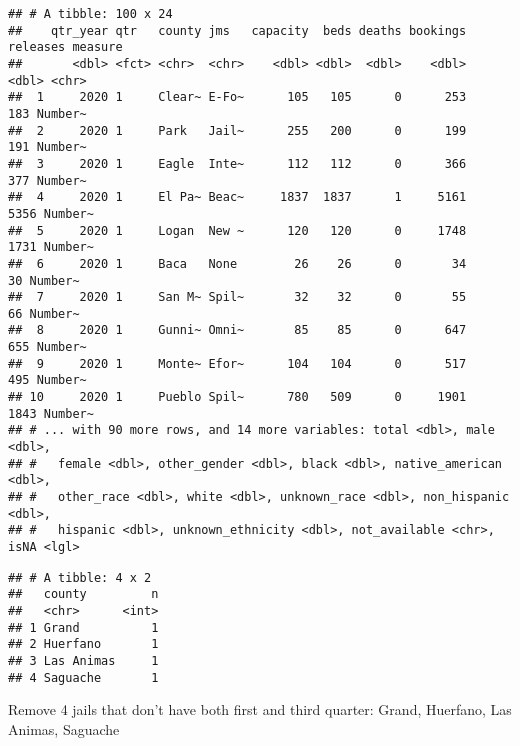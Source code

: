 \documentclass[
]{article}
\newenvironment{Shaded}{\begin{snugshade}}{\end{snugshade}}
\newcommand{\DecValTok}[1]{\textcolor[rgb]{0.00,0.00,0.81}{#1}}
\newcommand{\KeywordTok}[1]{\textcolor[rgb]{0.13,0.29,0.53}{\textbf{#1}}}
\newcommand{\NormalTok}[1]{#1}
\newcommand{\OperatorTok}[1]{\textcolor[rgb]{0.81,0.36,0.00}{\textbf{#1}}}
\newcommand{\StringTok}[1]{\textcolor[rgb]{0.31,0.60,0.02}{#1}}
\begin{document}
\begin{verbatim}
## # A tibble: 100 x 24
##    qtr_year qtr   county jms   capacity  beds deaths bookings releases measure
##       <dbl> <fct> <chr>  <chr>    <dbl> <dbl>  <dbl>    <dbl>    <dbl> <chr>  
##  1     2020 1     Clear~ E-Fo~      105   105      0      253      183 Number~
##  2     2020 1     Park   Jail~      255   200      0      199      191 Number~
##  3     2020 1     Eagle  Inte~      112   112      0      366      377 Number~
##  4     2020 1     El Pa~ Beac~     1837  1837      1     5161     5356 Number~
##  5     2020 1     Logan  New ~      120   120      0     1748     1731 Number~
##  6     2020 1     Baca   None        26    26      0       34       30 Number~
##  7     2020 1     San M~ Spil~       32    32      0       55       66 Number~
##  8     2020 1     Gunni~ Omni~       85    85      0      647      655 Number~
##  9     2020 1     Monte~ Efor~      104   104      0      517      495 Number~
## 10     2020 1     Pueblo Spil~      780   509      0     1901     1843 Number~
## # ... with 90 more rows, and 14 more variables: total <dbl>, male <dbl>,
## #   female <dbl>, other_gender <dbl>, black <dbl>, native_american <dbl>,
## #   other_race <dbl>, white <dbl>, unknown_race <dbl>, non_hispanic <dbl>,
## #   hispanic <dbl>, unknown_ethnicity <dbl>, not_available <chr>, isNA <lgl>
\end{verbatim}

\begin{Shaded}
\end{Shaded}

\begin{verbatim}
## # A tibble: 4 x 2
##   county         n
##   <chr>      <int>
## 1 Grand          1
## 2 Huerfano       1
## 3 Las Animas     1
## 4 Saguache       1
\end{verbatim}

Remove 4 jails that don't have both first and third quarter: Grand,
Huerfano, Las Animas, Saguache
\end{document}
